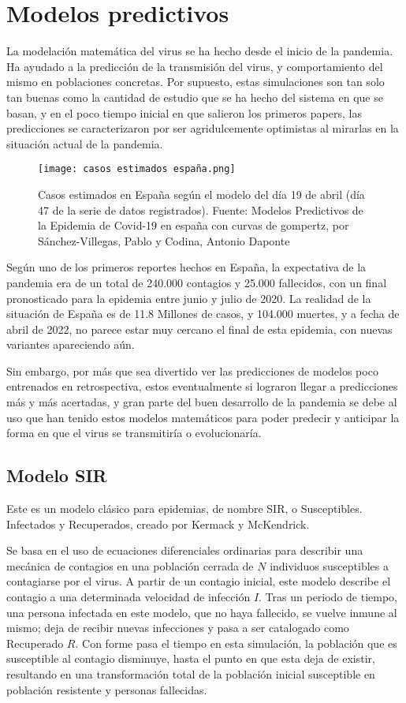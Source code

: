 \section{Modelos predictivos}

La modelación matemática del virus se ha hecho desde el inicio de la pandemia. Ha ayudado a la predicción de la transmisión del virus, y comportamiento del mismo en poblaciones concretas. Por supuesto, estas simulaciones son tan solo tan buenas como la cantidad de estudio que se ha hecho del sistema en que se basan, y en el poco tiempo inicial en que salieron los primeros papers, las predicciones se caracterizaron por ser agridulcemente optimistas al mirarlas en la situación actual de la pandemia.

\begin{figure}
    \texttt{[image: casos estimados españa.png]}
    \caption{Casos estimados en España según el modelo del día 19 de abril (día 47 de la serie de datos registrados). Fuente: Modelos Predictivos de la Epidemia de Covid-19 en españa con curvas de gompertz, por Sánchez-Villegas, Pablo y Codina, Antonio Daponte}
\end{figure}

Según uno de los primeros reportes hechos en España, la expectativa de la pandemia era de un total de 240.000 contagios y 25.000 fallecidos, con un final pronosticado para la epidemia entre junio y julio de 2020\cite{sanchez-villegas_codina_2020}. La realidad de la situación de España es de 11.8 Millones de casos, y 104.000 muertes, y a fecha de abril de 2022, no parece estar muy cercano el final de esta epidemia, con nuevas variantes apareciendo aún.

Sin embargo, por más que sea divertido ver las predicciones de modelos poco entrenados en retrospectiva, estos eventualmente si lograron llegar a predicciones más y más acertadas, y gran parte del buen desarrollo de la pandemia se debe al uso que han tenido estos modelos matemáticos para poder predecir y anticipar la forma en que el virus se transmitiría o evolucionaría.

\subsection{Modelo SIR} 
Este es un modelo clásico para epidemias, de nombre SIR, o Susceptibles. Infectados y Recuperados, creado por Kermack y McKendrick. 

Se basa en el uso de ecuaciones diferenciales ordinarias para describir una mecánica de contagios en una población cerrada de $N$ individuos susceptibles a contagiarse por el virus. A partir de un contagio inicial, este modelo describe el contagio a una determinada velocidad de infección $I$. Tras un periodo de tiempo, una persona infectada en este modelo, que no haya fallecido, se vuelve inmune al mismo; deja de recibir nuevas infecciones y pasa a ser catalogado como Recuperado $R$. Con forme pasa el tiempo en esta simulación, la población que es susceptible al contagio disminuye, hasta el punto en que esta deja de existir, resultando en una transformación total de la población inicial susceptible en población resistente y personas fallecidas.

